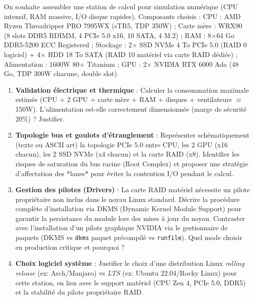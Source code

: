 \documentclass[11pt]{article}
\begin{document}
\begin{exercice}
On souhaite assembler une station de calcul pour simulation numérique (CPU intensif, RAM massive, I/O disque rapides). Composants choisis : 
CPU : AMD Ryzen Threadripper PRO 7995WX (sTR5, TDP 350W) ; 
Carte mère : WRX90 (8 slots DDR5 RDIMM, 4 PCIe 5.0 x16, 10 SATA, 4 M.2) ; 
RAM : 8$\times$64 Go DDR5-5200 ECC Registered ; 
Stockage : 2$\times$ SSD NVMe 4 To PCIe 5.0 (RAID 0 logiciel) + 4$\times$ HDD 18 To SATA (RAID 10 matériel via carte RAID dédiée) ; 
Alimentation : 1600W 80+ Titanium ; 
GPU : 2$\times$ NVIDIA RTX 6000 Ada (48 Go, TDP 300W chacune, double slot).
\begin{enumerate}
    \item \textbf{Validation électrique et thermique} : Calculer la consommation maximale estimée (CPU + 2 GPU + carte mère + RAM + disques + ventilateurs $\approx$ 150W). L'alimentation est-elle correctement dimensionnée (marge de sécurité 20\%) ? Justifier.
    \item \textbf{Topologie bus et goulots d'étranglement} : Représenter schématiquement (texte ou ASCII art) la topologie PCIe 5.0 entre CPU, les 2 GPU (x16 chacun), les 2 SSD NVMe (x4 chacun) et la carte RAID (x8). Identifier les risques de saturation du bus racine (Root Complex) et proposer une stratégie d'affectation des *lanes* pour éviter la contention I/O pendant le calcul.
    \item \textbf{Gestion des pilotes (Drivers)} : La carte RAID matériel nécessite un pilote propriétaire non inclus dans le noyau Linux standard. Décrire la procédure complète d'installation via DKMS (Dynamic Kernel Module Support) pour garantir la persistance du module lors des mises à jour du noyau. Contraster avec l'installation d'un pilote graphique NVIDIA via le gestionnaire de paquets (DKMS vs \texttt{dkms} paquet précompilé vs \texttt{runfile}). Quel mode choisir en production critique et pourquoi ?
    \item \textbf{Choix logiciel système} : Justifier le choix d'une distribution Linux \textit{rolling release} (ex: Arch/Manjaro) vs \textit{LTS} (ex: Ubuntu 22.04/Rocky Linux) pour cette station, en lien avec le support matériel (CPU Zen 4, PCIe 5.0, DDR5) et la stabilité du pilote propriétaire RAID.
\end{enumerate}
\end{exercice}
\end{document}
